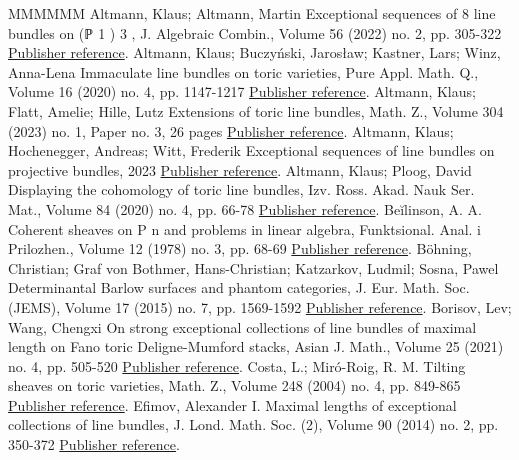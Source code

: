 \begin{thebibliography}{MMMMMM}
 Altmann, Klaus; Altmann, Martin Exceptional sequences of 8 line bundles on (ℙ 1 ) 3 , J. Algebraic Combin., Volume 56 (2022) no. 2, pp. 305-322 \href{https://alco.centre-mersenne.org/articles/10.5802/alco.371/#p1p1p1}{Publisher reference}.
 Altmann, Klaus; Buczyński, Jarosław; Kastner, Lars; Winz, Anna-Lena Immaculate line bundles on toric varieties, Pure Appl. Math. Q., Volume 16 (2020) no. 4, pp. 1147-1217 \href{https://alco.centre-mersenne.org/articles/10.5802/alco.371/#immaculate}{Publisher reference}.
 Altmann, Klaus; Flatt, Amelie; Hille, Lutz Extensions of toric line bundles, Math. Z., Volume 304 (2023) no. 1, Paper no. 3, 26 pages \href{https://alco.centre-mersenne.org/articles/10.5802/alco.371/#displayingExt}{Publisher reference}.
 Altmann, Klaus; Hochenegger, Andreas; Witt, Frederik Exceptional sequences of line bundles on projective bundles, 2023 \href{https://alco.centre-mersenne.org/articles/10.5802/alco.371/#exsec}{Publisher reference}.
 Altmann, Klaus; Ploog, David Displaying the cohomology of toric line bundles, Izv. Ross. Akad. Nauk Ser. Mat., Volume 84 (2020) no. 4, pp. 66-78 \href{https://alco.centre-mersenne.org/articles/10.5802/alco.371/#dop}{Publisher reference}.
 Beĭlinson, A. A. Coherent sheaves on P n  and problems in linear algebra, Funktsional. Anal. i Prilozhen., Volume 12 (1978) no. 3, pp. 68-69 \href{https://alco.centre-mersenne.org/articles/10.5802/alco.371/#beilinson}{Publisher reference}.
 Böhning, Christian; Graf von Bothmer, Hans-Christian; Katzarkov, Ludmil; Sosna, Pawel Determinantal Barlow surfaces and phantom categories, J. Eur. Math. Soc. (JEMS), Volume 17 (2015) no. 7, pp. 1569-1592 \href{https://alco.centre-mersenne.org/articles/10.5802/alco.371/#Phantom}{Publisher reference}.
 Borisov, Lev; Wang, Chengxi On strong exceptional collections of line bundles of maximal length on Fano toric Deligne-Mumford stacks, Asian J. Math., Volume 25 (2021) no. 4, pp. 505-520 \href{https://alco.centre-mersenne.org/articles/10.5802/alco.371/#BorisovWang}{Publisher reference}.
 Costa, L.; Miró-Roig, R. M. Tilting sheaves on toric varieties, Math. Z., Volume 248 (2004) no. 4, pp. 849-865 \href{https://alco.centre-mersenne.org/articles/10.5802/alco.371/#CostaMiroRoig}{Publisher reference}.
 Efimov, Alexander I. Maximal lengths of exceptional collections of line bundles, J. Lond. Math. Soc. (2), Volume 90 (2014) no. 2, pp. 350-372 \href{https://alco.centre-mersenne.org/articles/10.5802/alco.371/#efimov}{Publisher reference}.

\end{thebibliography}
